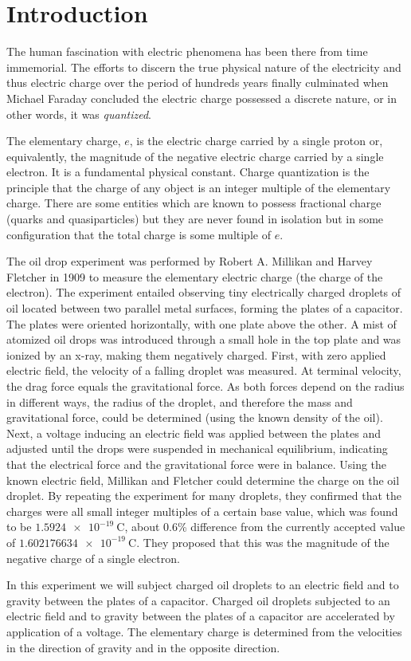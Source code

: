 \documentclass[%
 reprint,
 amsmath,amssymb,
 aps,
]{revtex4-2}
\begin{document}
\section{\label{sec:level1}Introduction}
    The human fascination with electric phenomena has been there from time immemorial. The efforts to discern the true physical nature of the electricity and thus electric charge over the period of hundreds years finally culminated when Michael Faraday concluded the electric charge possessed a discrete nature, or in other words, it was \textit{quantized}. 
    \par
    The elementary charge, $e$, is the electric charge carried by a single proton or, equivalently, the magnitude of the negative electric charge carried by a single electron. It is a fundamental physical constant. Charge quantization is the principle that the charge of any object is an integer multiple of the elementary charge. There are some entities which are known to possess fractional charge (quarks and quasiparticles) but they are never found in isolation but in some configuration that the total charge is some multiple of $e$.
    \par
    The oil drop experiment was performed by Robert A. Millikan and Harvey Fletcher in 1909 to measure the elementary electric charge (the charge of the electron). The experiment entailed observing tiny electrically charged droplets of oil located between two parallel metal surfaces, forming the plates of a capacitor. The plates were oriented horizontally, with one plate above the other. A mist of atomized oil drops was introduced through a small hole in the top plate and was ionized by an x-ray, making them negatively charged. First, with zero applied electric field, the velocity of a falling droplet was measured. At terminal velocity, the drag force equals the gravitational force. As both forces depend on the radius in different ways, the radius of the droplet, and therefore the mass and gravitational force, could be determined (using the known density of the oil). Next, a voltage inducing an electric field was applied between the plates and adjusted until the drops were suspended in mechanical equilibrium, indicating that the electrical force and the gravitational force were in balance. Using the known electric field, Millikan and Fletcher could determine the charge on the oil droplet. By repeating the experiment for many droplets, they confirmed that the charges were all small integer multiples of a certain base value, which was found to be $\SI{1.5924e-19}{\coulomb}$, about 0.6\% difference from the currently accepted value of $\SI{1.602176634e-19}{\coulomb}$. They proposed that this was the magnitude of the negative charge of a single electron.
    \par
    In this experiment we will subject charged oil droplets to an electric field and to gravity between the plates of a capacitor. Charged oil droplets subjected to an electric field and to gravity between the plates of a capacitor are accelerated by application of a voltage. The elementary charge is determined from the velocities in the direction of gravity and in the opposite direction.
    
\end{document}
